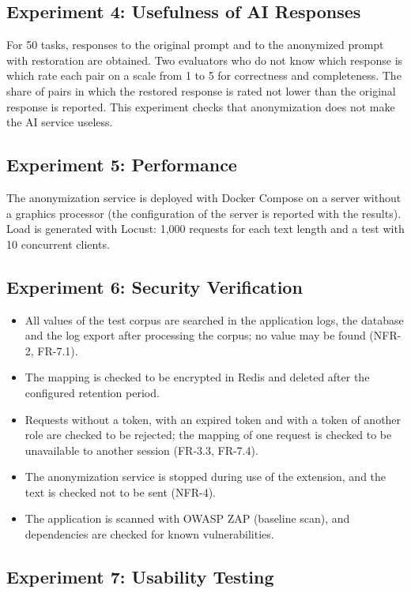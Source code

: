 \documentclass[12pt,a4paper]{article}
\begin{document}
\subsection{Experiment 4: Usefulness of AI Responses}

For 50 tasks, responses to the original prompt and to the anonymized prompt with restoration are obtained. Two evaluators who do not know which response is which rate each pair on a scale from 1 to 5 for correctness and completeness. The share of pairs in which the restored response is rated not lower than the original response is reported. This experiment checks that anonymization does not make the AI service useless.

\subsection{Experiment 5: Performance}

The anonymization service is deployed with Docker Compose on a server without a graphics processor (the configuration of the server is reported with the results). Load is generated with Locust: 1,000 requests for each text length and a test with 10 concurrent clients.

\subsection{Experiment 6: Security Verification}

\begin{itemize}
\item All values of the test corpus are searched in the application logs, the database and the log export after processing the corpus; no value may be found (NFR-2, FR-7.1).
\item The mapping is checked to be encrypted in Redis and deleted after the configured retention period.
\item Requests without a token, with an expired token and with a token of another role are checked to be rejected; the mapping of one request is checked to be unavailable to another session (FR-3.3, FR-7.4).
\item The anonymization service is stopped during use of the extension, and the text is checked not to be sent (NFR-4).
\item The application is scanned with OWASP ZAP (baseline scan), and dependencies are checked for known vulnerabilities.
\end{itemize}

\subsection{Experiment 7: Usability Testing}
\end{document}
